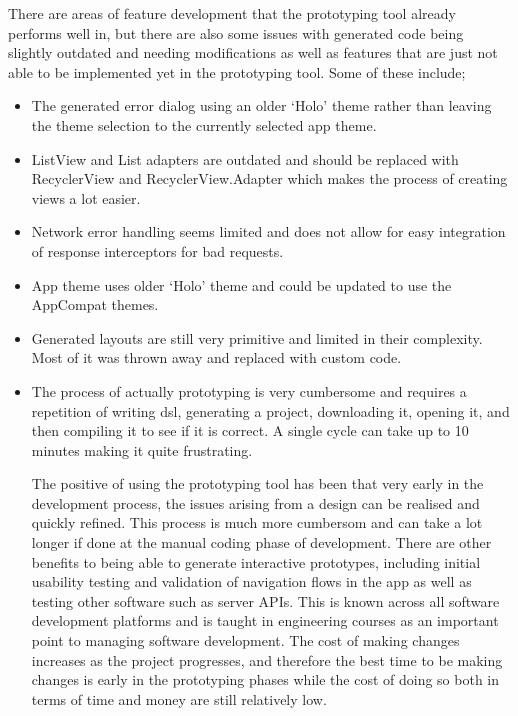 \documentclass[11pt,english,numbers=endperiod,parskip=half,abstract=on]{scrreprt}
\begin{document}
  There are areas of feature development that the prototyping tool already
  performs well in, but there are also some issues with generated code being
  slightly outdated and needing modifications as well as features that are just
  not able to be implemented yet in the prototyping tool. Some of these include;
  \begin{itemize}
    \item{
      The generated error dialog using an older `Holo' theme rather than leaving
      the theme selection to the currently selected app theme.
    }
    \item{
      ListView and List adapters are outdated and should be replaced with
      RecyclerView and RecyclerView.Adapter which makes the process of creating
      views a lot easier.
    }
    \item{
      Network error handling seems limited and does not allow for easy
      integration of response interceptors for bad requests.
    }
    \item{
      App theme uses older `Holo' theme and could be updated to use the
      AppCompat themes.
    }
    \item{
      Generated layouts are still very primitive and limited in their complexity.
      Most of it was thrown away and replaced with custom code.
    }
    \item{
      The process of actually prototyping is very cumbersome and requires a
      repetition of writing dsl, generating a project, downloading it,
      opening it, and then compiling it to see if it is correct. A single cycle
      can take up to 10 minutes making it quite frustrating.
    }

    The positive of using the prototyping tool has been that very early in the
    development process, the issues arising from a design can be realised and
    quickly refined. This process is much more cumbersom and can take a lot
    longer if done at the manual coding phase of development. There are other
    benefits to being able to generate interactive prototypes, including initial
    usability testing and validation of navigation flows in the app as well as
    testing other software such as server APIs. This is known across all
    software development platforms and is taught in engineering courses as an
    important point to managing software development. The cost of making changes
    increases as the project progresses, and therefore the best time to be making
    changes is early in the prototyping phases while the cost of doing so both
    in terms of time and money are still relatively low.


\end{itemize}
\end{document}
